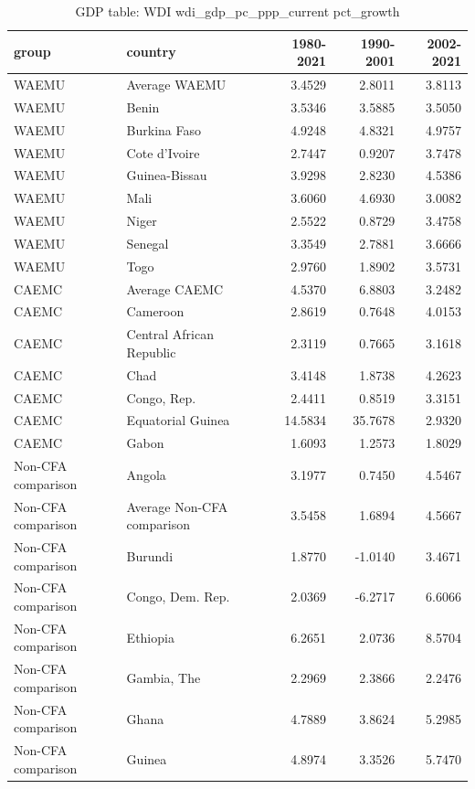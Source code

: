 \begin{table}

\caption{GDP table: WDI wdi_gdp_pc_ppp_current pct_growth}
\centering
\begin{tabular}[t]{llrrr}
\toprule
group & country & 1980-2021 & 1990-2001 & 2002-2021\\
\midrule
WAEMU & Average WAEMU & 3.4529 & 2.8011 & 3.8113\\
WAEMU & Benin & 3.5346 & 3.5885 & 3.5050\\
WAEMU & Burkina Faso & 4.9248 & 4.8321 & 4.9757\\
WAEMU & Cote d'Ivoire & 2.7447 & 0.9207 & 3.7478\\
WAEMU & Guinea-Bissau & 3.9298 & 2.8230 & 4.5386\\
\addlinespace
WAEMU & Mali & 3.6060 & 4.6930 & 3.0082\\
WAEMU & Niger & 2.5522 & 0.8729 & 3.4758\\
WAEMU & Senegal & 3.3549 & 2.7881 & 3.6666\\
WAEMU & Togo & 2.9760 & 1.8902 & 3.5731\\
CAEMC & Average CAEMC & 4.5370 & 6.8803 & 3.2482\\
\addlinespace
CAEMC & Cameroon & 2.8619 & 0.7648 & 4.0153\\
CAEMC & Central African Republic & 2.3119 & 0.7665 & 3.1618\\
CAEMC & Chad & 3.4148 & 1.8738 & 4.2623\\
CAEMC & Congo, Rep. & 2.4411 & 0.8519 & 3.3151\\
CAEMC & Equatorial Guinea & 14.5834 & 35.7678 & 2.9320\\
\addlinespace
CAEMC & Gabon & 1.6093 & 1.2573 & 1.8029\\
Non-CFA comparison & Angola & 3.1977 & 0.7450 & 4.5467\\
Non-CFA comparison & Average Non-CFA comparison & 3.5458 & 1.6894 & 4.5667\\
Non-CFA comparison & Burundi & 1.8770 & -1.0140 & 3.4671\\
Non-CFA comparison & Congo, Dem. Rep. & 2.0369 & -6.2717 & 6.6066\\
\addlinespace
Non-CFA comparison & Ethiopia & 6.2651 & 2.0736 & 8.5704\\
Non-CFA comparison & Gambia, The & 2.2969 & 2.3866 & 2.2476\\
Non-CFA comparison & Ghana & 4.7889 & 3.8624 & 5.2985\\
Non-CFA comparison & Guinea & 4.8974 & 3.3526 & 5.7470\\

\end{tabular}
\end{table}
